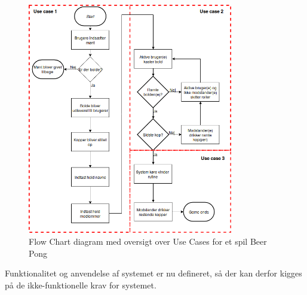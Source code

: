 \documentclass[Rapport/Rapport_main.tex]{subfiles}
\begin{document}
\begin{figure}[H]
    \centering
    \includegraphics[width=0.8\textwidth]{Kravspecifikation/Flowchart/pics/Beerpongflowchart.png}
    \caption{Flow Chart diagram med oversigt over Use Cases for et spil Beer Pong}
    \label{fig:rap_beer_pong_flow}
\end{figure}
Funktionalitet og anvendelse af systemet er nu defineret, så der kan derfor kigges på de ikke-funktionelle krav for systemet.
\end{document}
